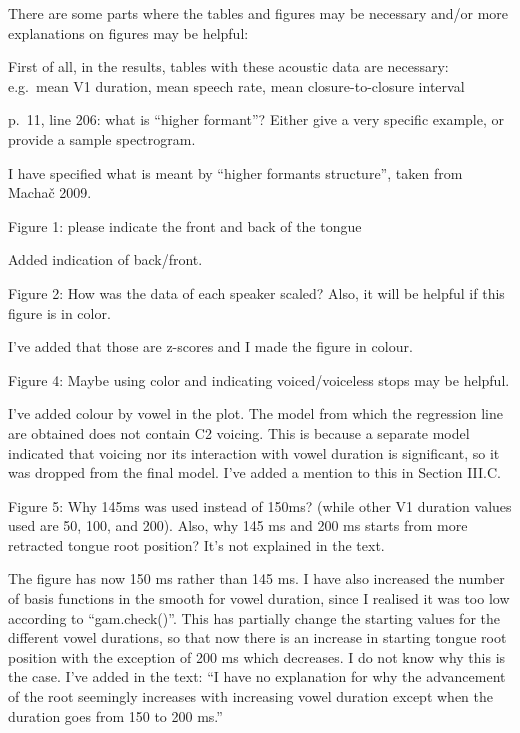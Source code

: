 \documentclass[]{article}
\begin{document}
There are some parts where the tables and figures may be necessary
and/or more explanations on figures may be helpful:

First of all, in the results, tables with these acoustic data are
necessary: e.g.~mean V1 duration, mean speech rate, mean
closure-to-closure interval

p.~11, line 206: what is ``higher formant''? Either give a very specific
example, or provide a sample spectrogram.

\color{plum}

I have specified what is meant by ``higher formants structure'', taken
from Machač 2009. \color{black}

Figure 1: please indicate the front and back of the tongue

\color{plum}

Added indication of back/front. \color{black}

Figure 2: How was the data of each speaker scaled? Also, it will be
helpful if this figure is in color.

\color{plum}

I've added that those are z-scores and I made the figure in colour.
\color{black}

Figure 4: Maybe using color and indicating voiced/voiceless stops may be
helpful.

\color{plum}

I've added colour by vowel in the plot. The model from which the
regression line are obtained does not contain C2 voicing. This is
because a separate model indicated that voicing nor its interaction with
vowel duration is significant, so it was dropped from the final model.
I've added a mention to this in Section III.C. \color{black}

Figure 5: Why 145ms was used instead of 150ms? (while other V1 duration
values used are 50, 100, and 200). Also, why 145 ms and 200 ms starts
from more retracted tongue root position? It's not explained in the
text.

\color{plum}

The figure has now 150 ms rather than 145 ms. I have also increased the
number of basis functions in the smooth for vowel duration, since I
realised it was too low according to ``gam.check()''. This has partially
change the starting values for the different vowel durations, so that
now there is an increase in starting tongue root position with the
exception of 200 ms which decreases. I do not know why this is the case.
I've added in the text: ``I have no explanation for why the advancement
of the root seemingly increases with increasing vowel duration except
when the duration goes from 150 to 200 ms.'' \color{black}
\end{document}
